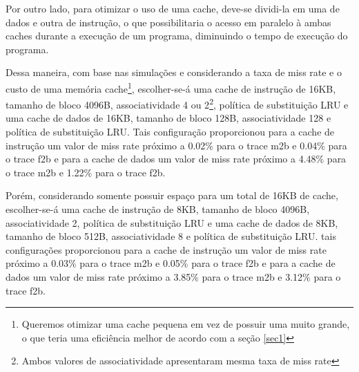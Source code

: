 \documentclass[12pt,a4paper]{article}
\begin{document}
Por outro lado, para otimizar o uso de uma cache, deve-se dividi-la em
uma de dados e outra de instrução, o que possibilitaria o acesso em
paralelo à ambas caches durante a execução de um programa, diminuindo
o tempo de execução do programa.

Dessa maneira, com base nas simulações e considerando a taxa de miss rate e o custo de uma memória
cache\footnote{Queremos otimizar uma cache pequena em vez de possuir
  uma muito grande, o que teria uma eficiência melhor de acordo com a
seção \ref{sec1}}, escolher-se-á uma cache de instrução de 16KB, tamanho
de bloco 4096B, associatividade 4 ou 2\footnote{Ambos valores de
  associatividade apresentaram mesma taxa de miss rate}, política de
substituição LRU e uma cache de dados de 16KB, tamanho
de bloco 128B, associatividade 128 e política de substituição LRU.
Tais configuração proporcionou para a cache de instrução um valor de miss rate próximo a 0.02\% para o
trace m2b e 0.04\% para o trace f2b e para a cache de dados um valor de miss rate próximo a 4.48\% para o
trace m2b e 1.22\% para o trace f2b.

Porém, considerando somente possuir espaço para um total de 16KB de cache, 
escolher-se-á uma cache de instrução de 8KB, tamanho
de bloco 4096B, associatividade  2,  política de substituição LRU 
e uma cache de dados de 8KB, tamanho de bloco 512B, associatividade 8 e política de substituição LRU.
tais configurações proporcionou para a cache de instrução um valor de miss rate próximo a 0.03\% para o
trace m2b e 0.05\% para o trace f2b e para a cache de dados um valor de miss rate próximo a 3.85\% para o
trace m2b e 3.12\% para o trace f2b.




\begin{small}
  
\end{small}
\end{document}

